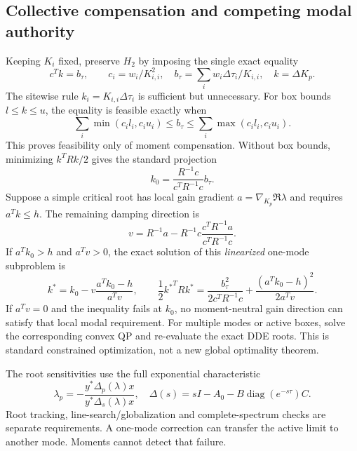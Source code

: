 \documentclass[11pt]{article}
\newcommand{\diag}{\operatorname{diag}}
\begin{document}
\subsection{Collective compensation and competing modal authority}
Keeping $K_i$ fixed, preserve $H_2$ by imposing the single exact equality
\begin{equation}
 c^Tk=b_\tau,\qquad
 c_i=w_i/K_{i,i}^2,\quad
 b_\tau=\sum_iw_i\Delta\tau_i/K_{i,i},\quad k=\Delta K_p.
 \label{eq:collectivemoment}
\end{equation}
The sitewise rule $k_i=K_{i,i}\Delta\tau_i$ is sufficient but unnecessary.
For box bounds $l\le k\le u$, the equality is feasible exactly when
\[
 \sum_i\min(c_il_i,c_iu_i)\le b_\tau\le
 \sum_i\max(c_il_i,c_iu_i).
\]
This proves feasibility only of moment compensation. Without box bounds,
minimizing $k^TRk/2$ gives the standard projection
\[
 k_0=\frac{R^{-1}c}{c^TR^{-1}c}b_\tau.
\]
Suppose a simple critical root has local gain gradient $a=\nabla_{K_p}\Re\lambda$
and requires $a^Tk\le h$. The remaining damping direction is
\[
 v=R^{-1}a-R^{-1}c\frac{c^TR^{-1}a}{c^TR^{-1}c}.
\]
If $a^Tk_0>h$ and $a^Tv>0$, the exact solution of this \emph{linearized}
one-mode subproblem is
\begin{equation}
 k^*=k_0-v\frac{a^Tk_0-h}{a^Tv},\qquad
 \frac12{k^*}^TRk^*
 =\frac{b_\tau^2}{2c^TR^{-1}c}
  +\frac{(a^Tk_0-h)^2}{2a^Tv}.
 \label{eq:projectedauthority}
\end{equation}
If $a^Tv=0$ and the inequality fails at $k_0$, no moment-neutral gain direction
can satisfy that local modal requirement. For multiple modes or active boxes,
solve the corresponding convex QP and re-evaluate the exact DDE roots.
This is standard constrained optimization, not a new global optimality theorem.

The root sensitivities use the full exponential characteristic
\[
 \lambda_p=-\frac{y^*\Delta_p(\lambda)x}
                  {y^*\Delta_s(\lambda)x},\quad
 \Delta(s)=sI-A_0-B\diag(e^{-s\tau})C.
\]
Root tracking, line-search/globalization and complete-spectrum checks are
separate requirements. A one-mode correction can transfer the active limit to
another mode. Moments cannot detect that failure.
\end{document}
